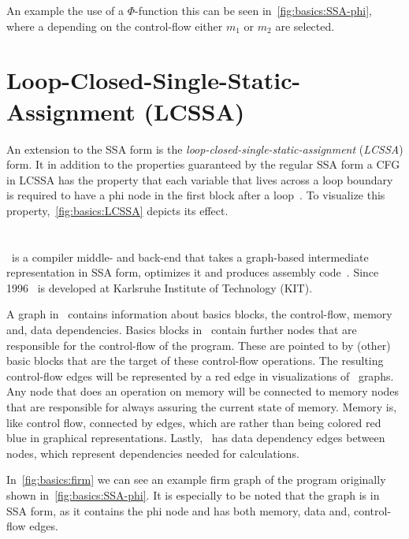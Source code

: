 An example the use of a $\Phi$-function this can be seen in~\cref{fig:basics:SSA-phi}, where a depending on the control-flow either $m_1$ or $m_2$ are selected.




\section{Loop-Closed-Single-Static-Assignment (LCSSA)}\label{sec:basics:LCSSA}

An extension to the SSA form is the \textit{loop-closed-single-static-assignment} (\textit{LCSSA}) form.
It in addition to the properties guaranteed by the regular SSA form a CFG in LCSSA has the property that each variable that lives across a loop boundary is required to have a phi node in the first block after a loop~\cite{LLVM_LCSSA}.
To visualize this property,~\cref{fig:basics:LCSSA} depicts its effect.



\section{\libFIRM}\label{sec:basics:firm}

\libFIRM~is a compiler middle- and back-end that takes a graph-based intermediate representation in SSA form, optimizes it and produces assembly code~\cite{libfirm}.
Since 1996 \libFIRM~is developed at Karlsruhe Institute of Technology (KIT).

A graph in \libFIRM~contains information about basics blocks, the control-flow, memory and, data dependencies.
Basics blocks in \libFIRM~contain further nodes that are responsible for the control-flow of the program.
These are pointed to by (other) basic blocks that are the target of these control-flow operations.
The resulting control-flow edges will be represented by a red edge in visualizations of \libFIRM~graphs.
Any node that does an operation on memory will be connected to memory nodes that are responsible for always assuring the current state of memory.
Memory is, like control flow, connected by edges, which are rather than being colored red blue in graphical representations.
Lastly, \libFIRM~has data dependency edges between nodes, which represent dependencies needed for calculations.

In~\cref{fig:basics:firm} we can see an example firm graph of the program originally shown in~\cref{fig:basics:SSA-phi}.
It is especially to be noted that the graph is in SSA form, as it contains the phi node and has both memory, data and, control-flow edges.

